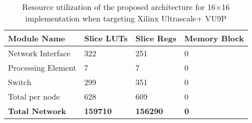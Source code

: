 \begin{table}[!t]
	\centering
	\caption {Resource utilization of the proposed architecture for 16$\times$16 implementation when targeting Xilinx Ultrascale+ VU9P} 
	\begin{tabular}{l|l|l|l}
		\toprule
		Module Name        & Slice LUTs & Slice Regs & Memory Block \\
		\midrule
		Network Interface  & 322        & 251        & 0              \\
		Processing Element & 7          & 7          & 0              \\
		Switch             & 299        & 351        & 0              \\
		\midrule
		Total per node     & 628        & 609        & 0              \\
		\midrule
		{\bf Total Network}      & {\bf 159710}     &  {\bf 156290}    & {\bf 0}              \\
		\bottomrule
	\end{tabular}
	\label{tab:util}
\end{table}